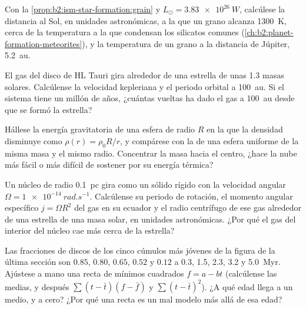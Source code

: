 \begin{exercise}[$\star\star$]\label{exo:b2:ism-star-formation:8}
Con la \cref{prop:b2:ism-star-formation:grain} y $L_\odot = \qty{3.83e26}{W}$,
calcúlese la distancia al Sol, en unidades astronómicas, a la que un grano
alcanza \qty{1300}{K}, cerca de la temperatura a la que condensan los silicatos comunes
(\cref{ch:b2:planet-formation-meteorites}), y
la temperatura de un grano a la distancia de Júpiter, \qty{5.2}{au}.
\end{exercise}

\begin{exercise}[$\star\star$]\label{exo:b2:ism-star-formation:9}
El gas del disco de HL Tauri gira alrededor de una estrella de unas \num{1.3} masas
solares. Calcúlense la velocidad kepleriana y el periodo orbital a \qty{100}{au}.
Si el sistema tiene un millón de años, ¿cuántas vueltas ha dado el gas a
\qty{100}{au} desde que se formó la estrella?
\end{exercise}

\begin{exercise}[$\star\star\star$]\label{exo:b2:ism-star-formation:10}
Hállese la energía gravitatoria de una esfera de radio $R$ en la que la densidad
disminuye como $\rho(r) = \rho_0 R/r$, y compárese con la de una esfera uniforme de
la misma masa y el mismo radio. Concentrar la masa hacia el centro, ¿hace
la nube más fácil o más difícil de sostener por su energía térmica?
\end{exercise}

\begin{exercise}[$\star\star\star$]\label{exo:b2:ism-star-formation:11}
Un núcleo de radio \qty{0.1}{pc} gira como un sólido rígido con la velocidad angular
$\Omega = \qty{1e-14}{rad.s^{-1}}$. Calcúlense su periodo de rotación, el momento angular
específico $j = \Omega R^2$ del gas en su ecuador y el radio
centrífugo de ese gas alrededor de una estrella de una masa solar, en unidades astronómicas.
¿Por qué el gas del interior del núcleo cae más cerca de la estrella?
\end{exercise}

\begin{exercise}[$\star\star\star$]\label{exo:b2:ism-star-formation:12}
Las fracciones de discos de los cinco cúmulos más jóvenes de la figura de la última
sección son $0.85$, $0.80$, $0.65$, $0.52$ y $0.12$ a 0.3, 1.5, 2.3, 3.2 y
\qty{5.0}{Myr}. Ajústese a mano una recta de mínimos cuadrados $f = a - bt$
(calcúlense las medias, y después $\sum(t - \bar t)(f - \bar f)$ y
$\sum(t - \bar t)^2$). ¿A qué edad llega a un medio, y a cero? ¿Por qué una
recta es un mal modelo más allá de esa edad?
\end{exercise}

